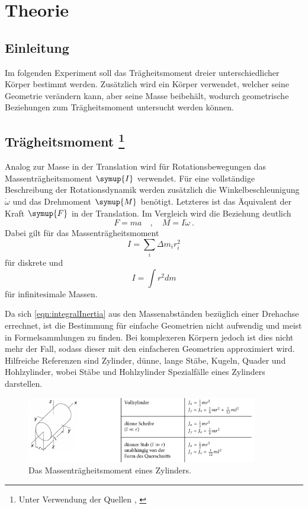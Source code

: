 \section{Theorie}
\label{sec:Theorie}
\subsection{Einleitung}
Im folgenden Experiment soll das Trägheitsmoment dreier unterschiedlicher Körper bestimmt werden.
Zusätzlich wird ein Körper verwendet, welcher seine Geometrie verändern kann, aber seine Masse beibehält,
wodurch geometrische Beziehungen zum Trägheitsmoment untersucht werden können.

\subsection{Trägheitsmoment \footnote{Unter Verwendung der Quellen \cite{taschenbuch}, \cite{Versuchsanleitung}}}
Analog zur Masse in der Translation wird für Rotationsbewegungen das Massenträgheitsmoment $\symup{I}$ verwendet.
Für eine vollständige Beschreibung der Rotationsdynamik werden zusätzlich die Winkelbeschleunigung $\dot{\omega}$
und das Drehmoment $\symup{M}$ benötigt. Letzteres ist das Äquivalent der Kraft $\symup{F}$ in der Translation.
Im Vergleich wird die Beziehung deutlich
\begin{equation}
    \label{eqn:FmaAnalogie}
    F = m a \quad ,\quad M = I\dot{\omega} \:.
\end{equation}
Dabei gilt für das Massenträgheitsmoment
\begin{equation*}
    I = \sum_i \Delta m_i r_i^2
\end{equation*}
für diskrete und
\begin{equation}
    \label{eqn:integralInertia}
    I = \int r^2 dm
\end{equation}
für infinitesimale Massen.

Da sich \eqref{eqn:integralInertia} aus den Massenabständen bezüglich einer Drehachse errechnet,
ist die Bestimmung für einfache Geometrien nicht aufwendig und meist in Formelsammlungen zu finden.
Bei komplexeren Körpern jedoch ist dies nicht mehr der Fall, sodass dieser mit den einfacheren Geometrien
approximiert wird.
Hilfreiche Referenzen sind Zylinder, dünne, lange Stäbe, Kugeln, Quader und Hohlzylinder, wobei Stäbe und Hohlzylinder
Spezialfälle eines Zylinders darstellen.
\begin{figure}
    \centering
    \includegraphics[width=0.9\textwidth]{plots/TrägheitZylinder.png}
    \caption{Das Massenträgheitsmoment eines Zylinders.\cite{taschenbuch}}
    \label{fig:traegZyl}
\end{figure}

